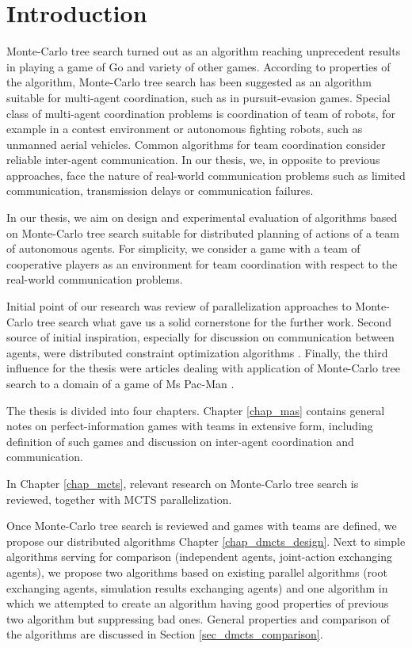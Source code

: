 \chapter*{Introduction}

Monte-Carlo tree search turned out as an algorithm reaching unprecedent results in playing a
game of Go \cite{Chaslot2008} and variety of other games. According to properties of the
algorithm, Monte-Carlo tree search has been suggested as an algorithm suitable for multi-agent
coordination, such as in pursuit-evasion games. Special class of multi-agent coordination problems
is coordination of team of robots, for example in a contest environment or
autonomous fighting robots, such as unmanned aerial vehicles. Common algorithms for team
coordination consider reliable inter-agent communication. In our thesis, we, in opposite to
previous approaches, face the nature of real-world communication problems such as limited
communication, transmission delays or communication failures.

In our thesis, we aim on design and experimental evaluation of algorithms based on Monte-Carlo 
tree search suitable for
distributed planning of actions of a team of autonomous agents.
For simplicity, we consider a game with a team of cooperative players as an environment
for team coordination with respect to the real-world communication problems.
    
Initial point of our research was review of parallelization approaches to Monte-Carlo tree 
search \cites{Cazenave2007}{Chaslot2008}{Teytaud2008} what gave us a solid cornerstone for the
further work. Second source of initial inspiration, especially for discussion on communication
between agents, were distributed constraint optimization algorithms \cite{Zivan2009}. Finally,
the third influence for the thesis were articles dealing with application of Monte-Carlo tree
search to a domain of a game of Ms Pac-Man \cites{Ikehata2011}{Nguyen2011}.

The thesis is divided into four chapters. Chapter \ref{chap_mas} contains 
general notes on perfect-information games with teams in extensive form, including 
definition of such games and discussion on inter-agent
coordination and communication. 

In Chapter \ref{chap_mcts}, relevant research on Monte-Carlo tree search is reviewed, together
with MCTS parallelization.

Once Monte-Carlo tree search is
reviewed and games with teams are defined, we propose our distributed algorithms Chapter
\ref{chap_dmcts_design}. Next to simple algorithms serving for comparison (independent agents,
joint-action exchanging agents), we propose two algorithms based on existing parallel
algorithms (root exchanging agents, simulation results exchanging agents) and one algorithm
in which we attempted to create an algorithm having good properties of previous two algorithm
but suppressing bad ones. General properties and comparison of the algorithms are discussed 
in Section \ref{sec_dmcts_comparison}.

